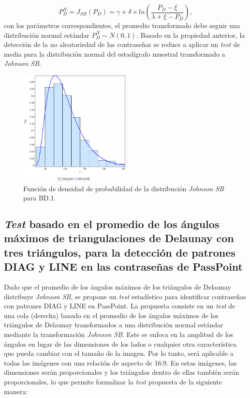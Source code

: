 \documentclass[12pt]{report}
\begin{document}
	  
	 \[
	 P_D^{N} = J_{SB}(P_D) = \gamma + \delta \times ln\left(\frac{P_D - \xi}{\lambda + \xi - P_D}\right),
	 \]
	 con los parámetros correspondientes, el promedio transformado debe seguir una distribución normal estándar $P_D^{N}\sim N(0,1)$. Basado en la propiedad anterior, la detección de la no aleatoriedad de las contraseñas se reduce a aplicar un \textit{test} de media para la distribución normal del estadígrafo muestral transformado a \textit{Johnson SB}.
	 \begin{figure}[ht]
	 	\centering
	 	
	 	\includegraphics[width=0.5\textwidth]{3td_fdp.png}
	 	\caption{Función de densidad de probabilidad de la  distribución \textit{Johnson SB} para BD.1.}
	 	\label{3TD_FDP}
	 \end{figure}
	 
	 
\subsection{\textit{Test} basado en el promedio de los ángulos máximos de triangulaciones de Delaunay con tres triángulos, para la detección de patrones DIAG y LINE en las contraseñas de PassPoint}
Dado  que el promedio de los ángulos máximos de los triángulos de Delaunay distribuye \textit{Johnson SB}, se propone un  \textit{test} estadístico para identificar contraseñas con patrones DIAG y LINE en PassPoint. La propuesta consiste en un \textit{test} de una cola (derecha) basado en el promedio de los ángulos máximos de los triángulos de Delaunay transformados a una distribución normal estándar mediante la transformación \textit{Johnson SB}.
Este se enfoca en la amplitud de los ángulos en lugar de las dimensiones de los lados o cualquier otra característica que pueda cambiar con el tamaño de la imagen. Por lo tanto, será aplicable a todas las imágenes con una relación de aspecto de 16:9. En estas imágenes, las dimensiones serán proporcionales y los triángulos dentro de ellas también serán proporcionales, lo que permite formalizar la \textit{test} propuesta de la siguiente manera:
\end{document}
